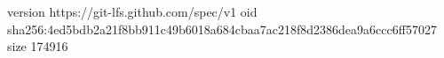 version https://git-lfs.github.com/spec/v1
oid sha256:4ed5bdb2a21f8bb911c49b6018a684cbaa7ac218f8d2386dea9a6ccc6ff57027
size 174916
